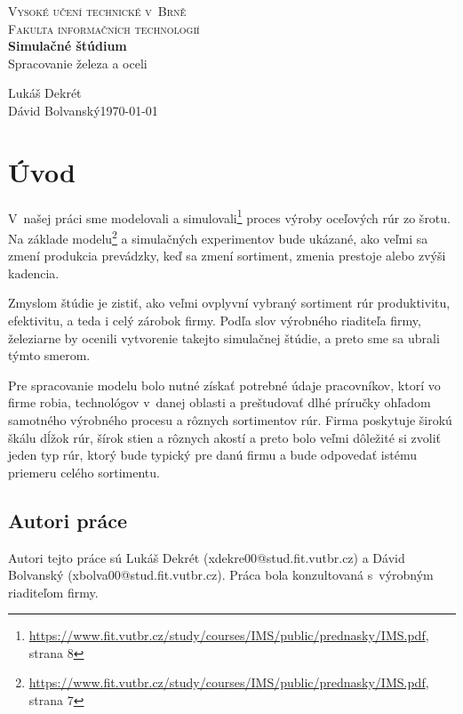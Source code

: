 \documentclass[]{article}
\begin{document}
\begin{titlepage}
	\begin{center}
		\textsc{{\LARGE Vysoké učení technické v~Brně\\[0.3em]
				Fakulta informačních technologií}}\\
		{\Huge \textbf{Simulačné štúdium}\\[0.5em]Spracovanie železa a oceli}
	\end{center}

	{\noindent \large Lukáš Dekrét\\Dávid Bolvanský\hfill \today}
\end{titlepage}

\section{Úvod}
V~našej práci sme modelovali a simulovali\footnote{\url{https://www.fit.vutbr.cz/study/courses/IMS/public/prednasky/IMS.pdf}, strana 8} proces výroby oceľových rúr zo šrotu. Na základe modelu\footnote{\url{https://www.fit.vutbr.cz/study/courses/IMS/public/prednasky/IMS.pdf}, strana 7} a simulačných experimentov bude ukázané, ako veľmi sa zmení produkcia prevádzky, keď sa zmení sortiment, zmenia prestoje alebo zvýši kadencia.

Zmyslom štúdie je zistiť, ako veľmi ovplyvní vybraný sortiment rúr produktivitu, efektivitu, a teda i celý zárobok firmy. Podľa slov výrobného riaditeľa firmy, železiarne by ocenili vytvorenie takejto simulačnej štúdie, a preto sme sa ubrali týmto smerom.

Pre spracovanie modelu bolo nutné získať potrebné údaje pracovníkov, ktorí vo firme robia, technológov v~danej oblasti a preštudovať dlhé príručky ohľadom samotného výrobného procesu a rôznych sortimentov rúr. Firma poskytuje širokú škálu dĺžok rúr, šírok stien a rôznych akostí a preto bolo veľmi dôležité si zvoliť jeden typ rúr, ktorý bude typický pre danú firmu a bude odpovedať istému priemeru celého sortimentu.


\subsection{Autori práce}
Autori tejto práce sú Lukáš Dekrét (xdekre00@stud.fit.vutbr.cz) a Dávid Bolvanský (xbolva00@stud.fit.vutbr.cz). Práca bola konzultovaná s~výrobným riaditeľom firmy.
\end{document}
